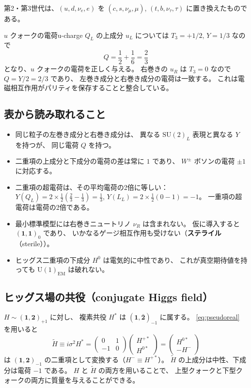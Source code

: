 \documentclass[uplatex,dvipdfmx,a4paper,11pt,openany]{jsbook}
\newcommand{\term}[2]{\textbf{#1}（#2）}
\numberwithin{equation}{chapter}
\theoremstyle{definition}
\theoremstyle{plain}
\theoremstyle{remark}
\newcommand{\SU}{\mathrm{SU}}
\newcommand{\U}{\mathrm{U}}
\begin{document}
第2・第3世代は、$(u,d,\nu_e,e)$ を
$(c,s,\nu_\mu,\mu)$, $(t,b,\nu_\tau,\tau)$ に置き換えたものである。
\begin{myex}{$u$ クォークの電荷}{u-charge}
$Q_L$ の上成分 $u_L$ については $T_3=+1/2$, $Y=1/3$ なので
\begin{equation}
Q=\frac12+\frac16=\frac23
\end{equation}
となり、$u$ クォークの電荷を正しく与える。
右巻きの $u_R$ は $T_3=0$ なので $Q=Y/2=2/3$ であり、
左巻き成分と右巻き成分の電荷は一致する。
これは電磁相互作用がパリティを保存することと整合している。
\end{myex}
\subsection{表から読み取れること}
\begin{itemize}
    \item 同じ粒子の左巻き成分と右巻き成分は、
    異なる $\SU(2)_L$ 表現と異なる $Y$ を持つが、
    同じ電荷 $Q$ を持つ。
    \item 二重項の上成分と下成分の電荷の差は常に $1$ であり、
    $W^\pm$ ボソンの電荷 $\pm1$ に対応する。
    \item 二重項の超電荷は、その平均電荷の2倍に等しい：
    $Y(Q_L)=2\times\frac12(\frac23-\frac13)=\frac13$,
    $Y(L_L)=2\times\frac12(0-1)=-1$。
    一重項の超電荷は電荷の2倍である。
    \item 最小標準模型には右巻きニュートリノ $\nu_R$ は含まれない。
    仮に導入すると $(\mathbf{1},\mathbf{1})_0$ であり、
    いかなるゲージ相互作用も受けない（\term{ステライル}{sterile}）。
    \item ヒッグス二重項の下成分 $H^0$ は電気的に中性であり、
    これが真空期待値を持っても $\U(1)_{\mathrm{EM}}$ は破れない。
\end{itemize}
\subsection{ヒッグス場の共役（conjugate Higgs field）}
$H\sim(\mathbf{1},\mathbf{2})_{+1}$ に対し、
複素共役 $H^*$ は $(\mathbf{1},\bar{\mathbf{2}})_{-1}$ に属する。
\eqref{eq:pseudoreal} を用いると
\begin{equation}
\tilde H\equiv i\sigma^2H^*
=\begin{pmatrix}0&1\\-1&0\end{pmatrix}
\begin{pmatrix}H^{+*}\\ H^{0*}\end{pmatrix}
=\begin{pmatrix}H^{0*}\\ -H^-\end{pmatrix}
\end{equation}
は $(\mathbf{1},\mathbf{2})_{-1}$ の二重項として変換する（$H^-\equiv H^{+*}$）。
$\tilde H$ の上成分は中性、下成分は電荷 $-1$ である。
$H$ と $\tilde H$ の両方を用いることで、
上型クォークと下型クォークの両方に質量を与えることができる。
\end{document}

